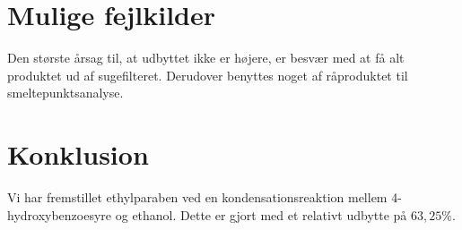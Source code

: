 \documentclass{report}
\begin{document}
\section*{Mulige fejlkilder}
Den største årsag til, at udbyttet ikke er højere, er besvær med at få alt produktet ud af sugefilteret.
Derudover benyttes noget af råproduktet til smeltepunktsanalyse.

\section*{Konklusion}
Vi har fremstillet ethylparaben ved en kondensationsreaktion mellem 4-hydroxybenzoesyre og ethanol.
Dette er gjort med et relativt udbytte på $63,25 \%$.
\end{document}
